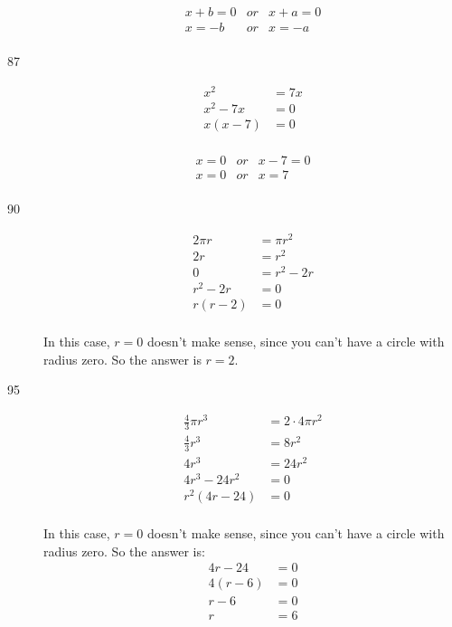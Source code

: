 \documentclass[fleqn,addpoints]{exam}
\begin{document}
\begin{description}
\begin{eqnarray*}
  x + b = 0 &or& x + a = 0 \\
  x = -b &or& x = -a \\
\end{eqnarray*}

\item[87]
\begin{align*}
  x^2 &= 7x \\
  x^2 - 7x &= 0 \\
  x(x - 7) &= 0 \\
\end{align*}

\begin{eqnarray*}
  x = 0 &or& x - 7 = 0 \\
  x = 0 &or& x = 7 \\
\end{eqnarray*}

\item[90]
\begin{align*}
  2 \pi r &= \pi r^2 \\
  2r &= r^2 \\
  0 &= r^2 - 2r \\
  r^2 - 2r &= 0 \\
  r(r - 2) &= 0 \\
\end{align*}

In this case, $r = 0$ doesn't make sense, since you can't have a circle with radius zero.  So the answer is 
$r = 2$.

\item[95]
\begin{align*}
  \frac{4}{3} \pi r^3 &= 2 \cdot 4 \pi r^2 \\
  \frac{4}{3} r^3 &= 8r^2 \\
  4r^3 &= 24r^2 \\
  4r^3 - 24r^2 &= 0 \\
  r^2(4r - 24) &= 0 \\
\end{align*}

In this case, $r = 0$ doesn't make sense, since you can't have a circle with radius zero.  So the answer is:
\begin{align*}
  4r - 24 &= 0 \\
  4(r - 6) &= 0 \\
  r - 6 &= 0 \\
  r &= 6 \\
\end{align*}


\end{description}
\end{document}
